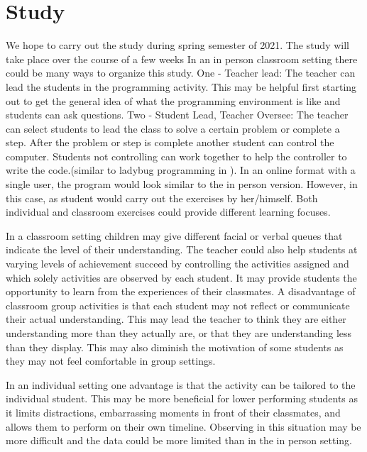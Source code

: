 \documentclass[12pt]{article}
\begin{document}
\section*{Study}
We hope to carry out the study during spring semester of 2021.
The study will take place over the course of a few weeks
In an in person classroom setting there could be many ways to organize this study. 
One - Teacher lead:
The teacher can lead the students in the programming activity. This may be helpful first starting out to get the general idea of what the programming environment is like and students can ask questions.
Two - Student Lead, Teacher Oversee: 
The teacher can select students to lead the class to solve a certain problem or complete a step. After the problem or step is complete another student can control the computer. Students not controlling can work together to help the controller to write the code.(similar to ladybug programming in \cite{fessakis}).
In an online format with a single user, the program would look similar to the in person version. However, in this case, as student would carry out the exercises by her/himself. 
Both individual and classroom exercises could provide different learning focuses. 

In a classroom setting children may give different facial or verbal queues that indicate the level of their understanding. The teacher could also help students at varying levels of achievement succeed by controlling the activities assigned and which solely activities are observed by each student. It may provide students the opportunity to learn from the experiences of their classmates. A disadvantage of classroom group activities is that each student may not reflect or communicate their actual understanding. This may lead the teacher to think they are either understanding more than they actually are, or that they are understanding less than they display. This may also diminish the motivation of some students as they may not feel comfortable in group settings. 

In an individual setting one advantage is that the activity can be tailored to the individual student. This may be more beneficial for lower performing students as it limits distractions, embarrassing moments in front of their classmates, and allows them to perform on their own timeline. Observing in this situation may be more difficult and the data could be more limited than in the in person setting. 
\end{document}
